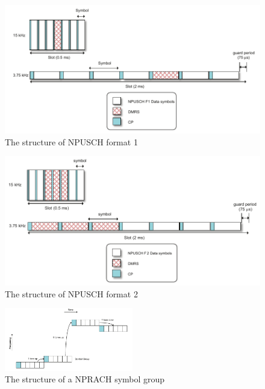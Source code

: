 \begin{minipage}{0.48\textwidth}
\begin{figure}[H]
\centering
\includegraphics[width=\textwidth]{figures/NPUSCH1_structure.pdf}
\caption{The structure of NPUSCH format 1 \citep{NB-IoT_Book}}
\label{fig:NPUSCH1_structure}
\end{figure}
\end{minipage}%
\hfill
\begin{minipage}{0.48\textwidth}
\begin{figure}[H]
\centering
\includegraphics[width=\textwidth]{figures/NPUSCH2_structure.pdf}
\caption{The structure of NPUSCH format 2 \citep{NB-IoT_Book}}
\label{fig:NPUSCH2_structure}
\end{figure}
\end{minipage}


\begin{figure}[H]
\centering
\includegraphics[width=0.5\textwidth]{figures/NPRACH_frequency_hopping.pdf}
\caption{The structure of a NPRACH symbol group \citep{NB-IoT_Book}}
\label{fig:NPRACH_structure}
\end{figure}

